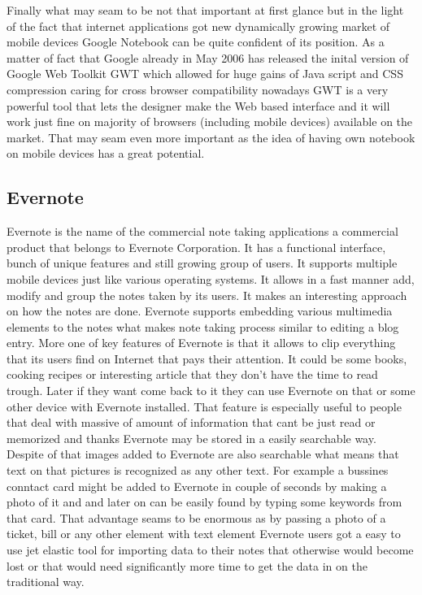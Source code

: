 Finally what may seam to be not that important at first glance but in the light of the fact that internet applications got new dynamically growing market of mobile devices Google Notebook can be quite  confident of its position. As a matter of fact that Google already in May 2006 has released the inital version of Google Web Toolkit GWT which allowed for huge gains of Java script and CSS compression caring for cross browser compatibility nowadays GWT is a very powerful tool that lets the designer make the Web based interface and it will work just fine on majority of browsers (including mobile devices) available on the market. That may seam even more important as the idea of having own notebook on mobile devices has a great potential. 

\subsection{Evernote}\label{subsec:evernote}
Evernote is the name of the commercial note taking applications a commercial product that belongs to Evernote Corporation. It has a functional interface, bunch of unique features and still growing group of users. It supports multiple mobile devices just like various operating systems. It allows in a fast manner add, modify and group the notes taken by its users. It makes an interesting approach on how the notes are done. Evernote supports embedding various multimedia elements  to the notes what makes note taking process similar to editing a blog entry. More one of key features of Evernote is that it allows to clip everything that its users find on Internet that pays their attention. It could be some books, cooking recipes or interesting article that they don't have the time to read trough. Later if they want come back to it they can use Evernote on that or some other device with Evernote installed. That feature is especially useful to people that deal with massive  of amount of information that cant be just read or memorized and thanks Evernote  may be stored in a easily searchable way. Despite of that images added to Evernote are also searchable what means that
text on that pictures is recognized as any other text. For example a bussines conntact card might be added to Evernote in couple of seconds by making a photo of it and and later on can be easily found by typing some keywords from that card. That advantage seams to be enormous as by passing a photo of a ticket, bill or any other element with text element  Evernote users got a easy to use jet elastic tool for importing data to their notes that otherwise would become lost or that would need significantly more time to get the data in on the traditional way.


